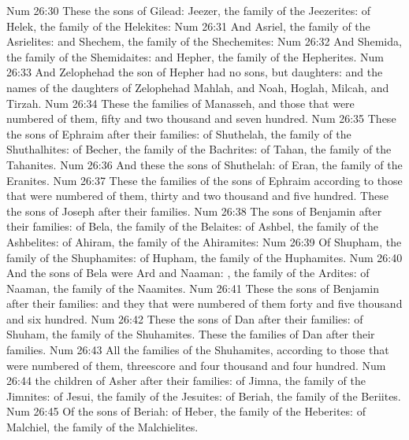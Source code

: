 \vs Num 26:30 These  the sons of Gilead:  Jeezer, the family of the Jeezerites: of Helek, the family of the Helekites:
\vs Num 26:31 And  Asriel, the family of the Asrielites: and  Shechem, the family of the Shechemites:
\vs Num 26:32 And  Shemida, the family of the Shemidaites: and  Hepher, the family of the Hepherites.
\vs Num 26:33 And Zelophehad the son of Hepher had no sons, but daughters: and the names of the daughters of Zelophehad  Mahlah, and Noah, Hoglah, Milcah, and Tirzah.
\vs Num 26:34 These  the families of Manasseh, and those that were numbered of them, fifty and two thousand and seven hundred.
\vs Num 26:35 These  the sons of Ephraim after their families: of Shuthelah, the family of the Shuthalhites: of Becher, the family of the Bachrites: of Tahan, the family of the Tahanites.
\vs Num 26:36 And these  the sons of Shuthelah: of Eran, the family of the Eranites.
\vs Num 26:37 These  the families of the sons of Ephraim according to those that were numbered of them, thirty and two thousand and five hundred. These  the sons of Joseph after their families.
\vs Num 26:38 The sons of Benjamin after their families: of Bela, the family of the Belaites: of Ashbel, the family of the Ashbelites: of Ahiram, the family of the Ahiramites:
\vs Num 26:39 Of Shupham, the family of the Shuphamites: of Hupham, the family of the Huphamites.
\vs Num 26:40 And the sons of Bela were Ard and Naaman: , the family of the Ardites:  of Naaman, the family of the Naamites.
\vs Num 26:41 These  the sons of Benjamin after their families: and they that were numbered of them  forty and five thousand and six hundred.
\vs Num 26:42 These  the sons of Dan after their families: of Shuham, the family of the Shuhamites. These  the families of Dan after their families.
\vs Num 26:43 All the families of the Shuhamites, according to those that were numbered of them,  threescore and four thousand and four hundred.
\vs Num 26:44  the children of Asher after their families: of Jimna, the family of the Jimnites: of Jesui, the family of the Jesuites: of Beriah, the family of the Beriites.
\vs Num 26:45 Of the sons of Beriah: of Heber, the family of the Heberites: of Malchiel, the family of the Malchielites.
